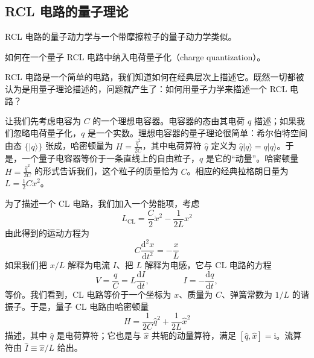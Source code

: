 \subsection{RCL 电路的量子理论}

\begin{keypoints}
\item RCL 电路的量子动力学与一个带摩擦粒子的量子动力学类似。
\item 如何在一个量子 RCL 电路中纳入电荷量子化（charge quantization）。
\end{keypoints}

RCL 电路是一个简单的电路，我们知道如何在经典层次上描述它。既然一切都被认为是用量子理论描述的，问题就产生了：如何用量子力学来描述一个 RCL 电路？

让我们先考虑电容为 $C$ 的一个理想电容器。电容器的态由其电荷 $q$ 描述；如果我们忽略电荷量子化，$q$ 是一个实数。理想电容器的量子理论很简单：希尔伯特空间由态 $\{|q\rangle\}$ 张成，哈密顿量为 $H = \frac{\hat{q}^2}{2C}$，其中电荷算符 $\hat{q}$ 定义为 $\hat{q}|q\rangle = q|q\rangle$。于是，一个量子电容器等价于一条直线上的自由粒子，$q$ 是它的“动量”。哈密顿量 $H = \frac{\hat{q}^2}{2C}$ 的形式告诉我们，这个粒子的质量恰为 $C$。相应的经典拉格朗日量为 $L = \frac{1}{2}C\dot{x}^2$。

为了描述一个 CL 电路，我们加入一个势能项，考虑
\begin{equation*}
L_{\mathrm{CL}} = \frac{C}{2}\dot{x}^2 - \frac{1}{2L}x^2 \tag{2.4.13}
\end{equation*}
由此得到的运动方程为
\begin{equation*}
C\frac{\mathrm{d}^2x}{\mathrm{d}t^2} = -\frac{x}{L}
\end{equation*}
如果我们把 $x/L$ 解释为电流 $I$、把 $L$ 解释为电感，它与 CL 电路的方程
\begin{equation*}
V = \frac{q}{C} = L\frac{\mathrm{d}I}{\mathrm{d}t}, \qquad\qquad I = -\frac{\mathrm{d}q}{\mathrm{d}t},
\end{equation*}
等价。我们看到，CL 电路等价于一个坐标为 $x$、质量为 $C$、弹簧常数为 $1/L$ 的谐振子。于是，量子 CL 电路由哈密顿量
\begin{equation*}
H = \frac{1}{2C}\hat{q}^2 + \frac{1}{2L}\hat{x}^2 \tag{2.4.14}
\end{equation*}
描述，其中 $\hat{q}$ 是电荷算符；它也是与 $\hat{x}$ 共轭的动量算符，满足 $[\hat{q}, \hat{x}] = \mathrm{i}$。流算符由 $\hat{I} \equiv \hat{x}/L$ 给出。

